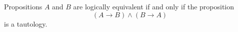 

\setcounter{section}{1}
\setcounter{subsection}{3}
\setcounter{dfn}{9}

\begin{thm}
Propositions $A$ and $B$ are logically equivalent if and only if the proposition
\[
(A \to B) \wedge (B \to A)
\]
is a tautology.
\end{thm}


